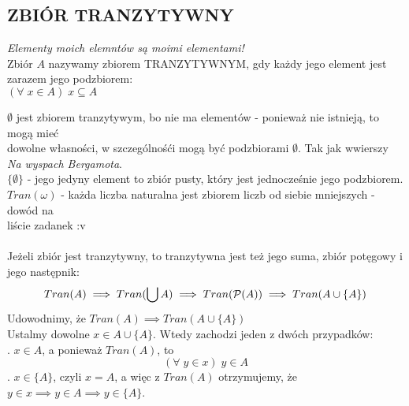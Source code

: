 \subsection{ZBIÓR TRANZYTYWNY}
\begin{center}
    \emph{Elementy moich elemntów są moimi elementami!}\medskip\\
    Zbiór $A$ nazywamy zbiorem {\color{acc}TRANZYTYWNYM}, gdy każdy jego element jest zarazem jego podzbiorem:\smallskip\\
    $(\forall\;x\in A)\;x\subseteq A$
\end{center}
$\emptyset$ jest zbiorem tranzytywym, bo nie ma elementów - ponieważ nie istnieją, to mogą mieć \\dowolne własności, w szczególnośći mogą być podzbiorami $\emptyset$. Tak jak wwierszy \emph{Na wyspach Bergamota}.\medskip\\
$\{\emptyset\}$ - jego jedyny element to zbiór pusty, który jest jednocześnie jego podzbiorem.\medskip\\
$Tran(\omega)$ - każda liczba naturalna jest zbiorem liczb od siebie mniejszych - dowód na \\liście zadanek :v\bigskip\\
\bigskip\\
Jeżeli zbiór jest tranzytywny, to tranzytywna jest też jego {\color{def}suma, zbiór potęgowy i jego następnik:}
$$Tran(A)\implies Tran(\bigcup A)\implies Tran(\mathcal{P}(A))\implies Tran(A\cup \{A\})$$
\dowod
Udowodnimy, że $Tran(A)\implies Tran(A\cup \{A\})$\medskip\\
Ustalmy dowolne $x\in A\cup\{A\}$. Wtedy zachodzi jeden z dwóch przypadków:\medskip\\
. $x\in A$, a ponieważ $Tran(A)$, to
$$(\forall\;y\in x)\;y\in A$$
. $x\in\{A\}$, czyli $x=A$, a więc z $Tran(A)$ otrzymujemy, że $y\in x\implies y\in A\implies y\in \{A\}$.
\kondow